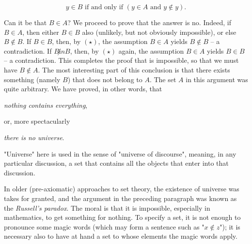\begin{equation}
	y \in B \text{ if and only if } (y \in A \text{ and } y \not \in y). \tag{$\star$}
\end{equation}

Can it be that $B \in A$? We proceed to prove that the answer is no. Indeed, if $B \in A$, then either $B \in B$ also (unlikely, but not obviously impossible), or else $B \not \in B$. If $B \in B$, then, by $(\star)$, the assumption $B \in A$ yields $B \not \in B$ -- a contradiction. If $B \not in B$, then, by $(\star)$ again, the assumption $B \in A$ yields $B \in B$ -- a contradiction. This completes the proof that is impossible, so that we must have $B \not \in A$. The most interesting part of this conclusion is that there exists something (namely $B$) that does not belong to $A$. The set $A$ in this argument was quite arbitrary. We have proved, in other words, that
\begin{center}
	\textit{nothing contains everything},
\end{center}
or, more spectacularly
\begin{center}
	\textit{there is no universe}.
\end{center}
"Universe" here is used in the sense of "universe of discourse", meaning, in any particular discussion, a set that contains all the objects that enter into that discussion.

In older (pre-axiomatic) approaches to set theory, the existence of universe was takes for granted, and the argument in the preceding paragraph was known as the \textit{Russell's paradox}. The moral is that it is impossible, especially in mathematics, to get something for nothing. To specify a set, it is not enough to pronounce some magic words (which may form a sentence such as "$x \not \in z$"); it is necessary also to have at hand a set to whose elements the magic words apply.